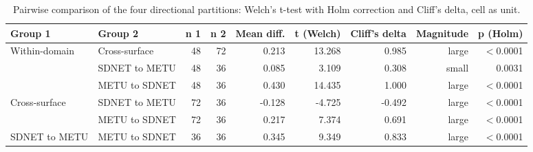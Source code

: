 \begin{table}[htbp]
\centering
\caption{Pairwise comparison of the four directional partitions: Welch's t-test with Holm correction and Cliff's delta, cell as unit.}
\label{tab:direccional-welch}
\begin{tabular}{llrrrrrrr}
\toprule
Group 1 & Group 2 & n 1 & n 2 & Mean diff. & t (Welch) & Cliff's delta & Magnitude & p (Holm) \\
\midrule
Within-domain & Cross-surface & 48 & 72 & 0.213 & 13.268 & 0.985 & large & $<$0.0001 \\
 & SDNET to METU & 48 & 36 & 0.085 & 3.109 & 0.308 & small & 0.0031 \\
 & METU to SDNET & 48 & 36 & 0.430 & 14.435 & 1.000 & large & $<$0.0001 \\
Cross-surface & SDNET to METU & 72 & 36 & -0.128 & -4.725 & -0.492 & large & $<$0.0001 \\
 & METU to SDNET & 72 & 36 & 0.217 & 7.374 & 0.691 & large & $<$0.0001 \\
SDNET to METU & METU to SDNET & 36 & 36 & 0.345 & 9.349 & 0.833 & large & $<$0.0001 \\
\bottomrule
\end{tabular}
\end{table}

